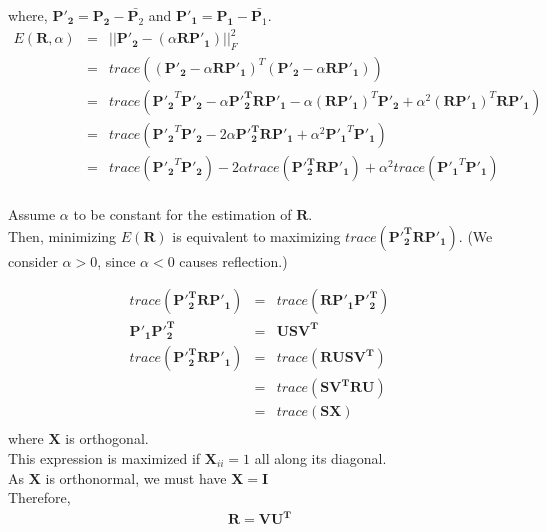 \documentclass[11pt]{article}
\begin{document}
where, $\boldsymbol{P'_2} = \boldsymbol{P_2} - \bar{\boldsymbol{P}_2}$ and $\boldsymbol{P'_1} = \boldsymbol{P_1} - \bar{\boldsymbol{P}_1}$. \\

\begin{align}
E(\boldsymbol{R}, \alpha) &=& ||\boldsymbol{P'_2}- (\alpha \boldsymbol{RP'_1}) ||_F^2\\\
&=& trace((\boldsymbol{P'_2}- \alpha \boldsymbol{RP'_1})^T(\boldsymbol{P'_2}- \alpha \boldsymbol{RP'_1}))\\
&=& trace(\boldsymbol{P'_2}^T\boldsymbol{P'_2} - \alpha \boldsymbol{P'^T_2RP'_1} - \alpha (\boldsymbol{RP'_1})^T\boldsymbol{P'_2} + \alpha^2 (\boldsymbol{RP'_1})^T\boldsymbol{RP'_1})\\
&=& trace(\boldsymbol{P'_2}^T\boldsymbol{P'_2} - 2\alpha \boldsymbol{P'^T_2RP'_1} + \alpha^2 \boldsymbol{P'_1}^T\boldsymbol{P'_1})\\
&=& trace(\boldsymbol{P'_2}^T\boldsymbol{P'_2}) - 2\alpha trace(\boldsymbol{P'^T_2RP'_1}) + \alpha^2 trace(\boldsymbol{P'_1}^T\boldsymbol{P'_1}) \label{eq:test} \\
\end{align}

Assume $\alpha$ to be constant for the estimation of $\boldsymbol{R}$. \\
Then, minimizing $E(\boldsymbol{R})$ is equivalent to maximizing $trace(\boldsymbol{P'^T_2RP'_1})$. (We consider $\alpha > 0$, since $\alpha < 0$ causes reflection.)

\begin{eqnarray*}
trace(\boldsymbol{P'^T_2RP'_1}) &=& trace(\boldsymbol{RP'_1P'^T_2})\\
\boldsymbol{P'_1P'^T_2} &=& \boldsymbol{USV^T}\\
trace(\boldsymbol{P'^T_2RP'_1}) &=& trace(\boldsymbol{RUSV^T})\\
&=& trace(\boldsymbol{SV^TRU}) \\
&=& trace(\boldsymbol{SX})\\
\end{eqnarray*}
where $\boldsymbol{X}$ is orthogonal. \\
This expression is maximized if $\boldsymbol{X}_{ii} = 1$ all along its diagonal. \\
As $\boldsymbol{X}$ is orthonormal, we must have $\boldsymbol{X} = \boldsymbol{I}$\\
Therefore,
\begin{eqnarray*}
\boldsymbol{R} = \boldsymbol{VU^T}\\
\end{eqnarray*}
\end{document}
